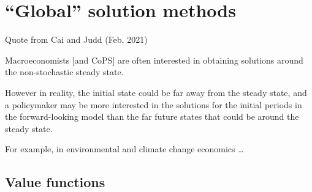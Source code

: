 \documentclass[handout,english]{beamer}
\begin{document}
\section{``Global'' solution methods}
\begin{frame}
  {\color{blue} Quote from Cai and Judd (Feb, 2021)}

  {\color{blue} Macroeconomists [and CoPS] are often interested in obtaining solutions around the non-stochastic steady state.}

  {\color{patrickcolor3} However in reality, the initial state could be far away from the steady state, and a policymaker may be more interested in the solutions for the initial periods in the forward-looking model than the far future states that could be around the steady state.}

  {\color{patrickcolor1} For example, in environmental and climate change economics \dots}
\end{frame}

\subsection{Value functions}
\end{document}
